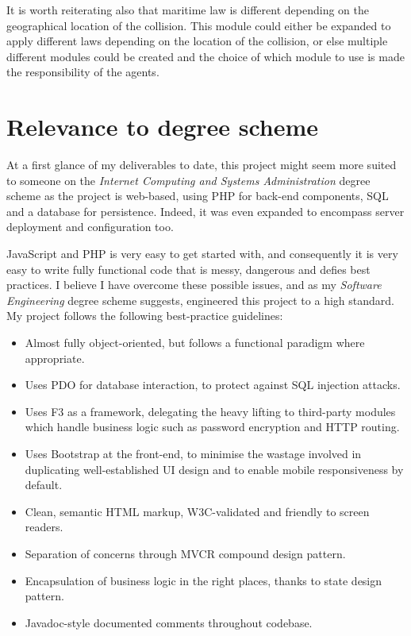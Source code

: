 It is worth reiterating also that maritime law is different depending on the geographical location of the collision. This module could either be expanded to apply different laws depending on the location of the collision, or else multiple different modules could be created and the choice of which module to use is made the responsibility of the agents.

\section{Relevance to degree scheme}

At a first glance of my deliverables to date, this project might seem more suited to someone on the \emph{Internet Computing and Systems Administration} degree scheme as the project is web-based, using PHP for back-end components, SQL and a database for persistence. Indeed, it was even expanded to encompass server deployment and configuration too.

JavaScript and PHP is very easy to get started with, and consequently it is very easy to write fully functional code that is messy, dangerous and defies best practices. I believe I have overcome these possible issues, and as my \emph{Software Engineering} degree scheme suggests, engineered this project to a high standard. My project follows the following best-practice guidelines:

\begin{itemize}
\item Almost fully object-oriented, but follows a functional paradigm where appropriate.
\item Uses PDO for database interaction, to protect against SQL injection attacks.
\item Uses F3 as a framework, delegating the heavy lifting to third-party modules which handle business logic such as password encryption and HTTP routing.
\item Uses Bootstrap at the front-end, to minimise the wastage involved in duplicating well-established UI design and to enable mobile responsiveness by default.
\item Clean, semantic HTML markup, W3C-validated and friendly to screen readers.
\item Separation of concerns through MVCR compound design pattern.
\item Encapsulation of business logic in the right places, thanks to state design pattern.
\item Javadoc-style documented comments throughout codebase.
\end{itemize}

